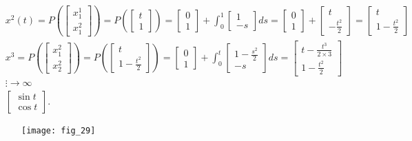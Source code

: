 \documentclass[../main.tex]{subfiles}
\begin{document}
\begin{przyklad}
\begin{align*}
        &x^2(t) = P\left(\begin{bmatrix} x_1^1\\x_1^2 \end{bmatrix} \right) = P\left( \begin{bmatrix} t\\1 \end{bmatrix}  \right)  = \begin{bmatrix} 0\\1 \end{bmatrix} + \int_0^1 \begin{bmatrix} 1\\-s \end{bmatrix} ds = \begin{bmatrix} 0\\1 \end{bmatrix} +\begin{bmatrix} t\\-\frac{t^2}{2} \end{bmatrix} = \begin{bmatrix} t\\1-\frac{t^2}{2} \end{bmatrix}\\
        &x^3 = P\left( \begin{bmatrix} x_1^2\\x_2^2 \end{bmatrix}  \right) = P\left( \begin{bmatrix} t\\1-\frac{t^2}{2} \end{bmatrix}  \right) = \begin{bmatrix} 0\\1 \end{bmatrix} + \int_0^t \begin{bmatrix} 1-\frac{s^2}{2}\\-s \end{bmatrix} ds = \begin{bmatrix} t-\frac{t^3}{2\times 3}\\1-\frac{t^2}{2} \end{bmatrix}\\
        &\vdots \to \infty\\
        &\begin{bmatrix} \sin{t}\\ \cos{t} \end{bmatrix}
    .\end{align*}
    \begin{figure}[h]
        \centering
        \texttt{[image: fig\_29]}
        \caption{}
        \label{fig:fig_29}
    \end{figure}
\end{przyklad}
\end{document}

